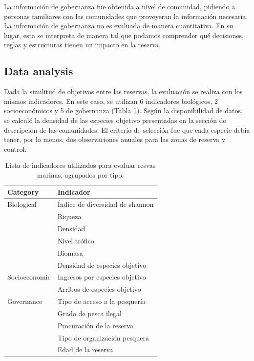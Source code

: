 \documentclass{frontiersSCNS}
\begin{document}
La información de gobernanza fue obtenida a nivel de comunidad, pidiendo
a personas familiares con las comunidades que proveyeran la información
necesaria. La información de gobernanza no es evaluada de manera
cuantitativa. En su lugar, esta se interpreta de manera tal que podamos
comprender qué decisiones, reglas y estructuras tienen un impacto en la
reserva.

\subsection{Data analysis}\label{data-analysis}

Dada la similitud de objetivos entre las reservas, la evaluación se
realiza con los mismos indicadores. En este caso, se utilizan 6
indicadores biológicos, 2 socioeconómicos y 5 de gobernanza (Tabla
\ref{table:indicators}). Según la disponibilidad de datos, se calculó la
densidad de las especies objetivo presentadas en la sección de
descripción de las comunidades. El criterio de selección fue que cada
especie debía tener, por lo menos, dos observaciones anuales para las
zonas de reserva y control.

\begin{table}

\caption{\label{tab:unnamed-chunk-2}\label{table:indicators}Lista de indicadores utilizados para evaluar resvas marinas, agrupados por tipo.}
\centering
\begin{tabular}[t]{l|l}
\hline
Category & Indicador\\
\hline
Biological & Índice de diversidad de shannon\\
\hline
 & Riqueza\\
\hline
 & Densidad\\
\hline
 & Nivel trófico\\
\hline
 & Biomasa\\
\hline
 & Densidad de especies objetivo\\
\hline
Socioeconomic & Ingresos por especies objetivo\\
\hline
 & Arribos de especies objetivo\\
\hline
Governance & Tipo de acceso a la pesquería\\
\hline
 & Grado de pesca ilegal\\
\hline
 & Procuración de la reserva\\
\hline
 & Tipo de organización pesquera\\
\hline
 & Edad de la reserva\\
\hline
\end{tabular}
\end{table}
\end{document}
